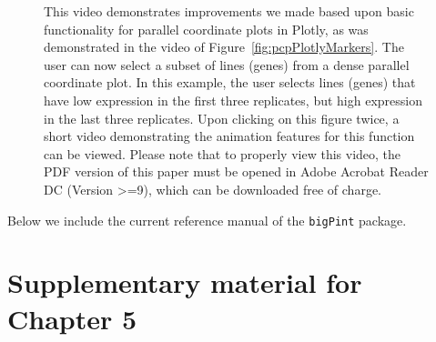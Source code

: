 \documentclass[11pt,a4paper,oldfontcommands,openany]{memoir}
\numberwithin{equation}{section} %
\newcommand{\pkg}[1]{{\texttt{#1}}}
\begin{document}
\begin{figure}[H]
    \begin{framed}
    \centering
    \end{framed}
    \caption{This video demonstrates improvements we made based upon basic functionality for parallel coordinate plots in Plotly, as was demonstrated in the video of Figure~\ref{fig:pcpPlotlyMarkers}. The user can now select a subset of lines (genes) from a dense parallel coordinate plot. In this example, the user selects lines (genes) that have low expression in the first three replicates, but high expression in the last three replicates. Upon clicking on this figure twice, a short video demonstrating the animation features for this function can be viewed. Please note that to properly view this video, the PDF version of this paper must be opened in Adobe Acrobat Reader DC (Version >=9), which can be downloaded free of charge.}
    \label{fig:pcpSeqSel}
\end{figure}

Below we include the current reference manual of the \pkg{bigPint} package.





\chapter{Supplementary material for Chapter 5}
\label{sec:suppchapter4}
\end{document}
